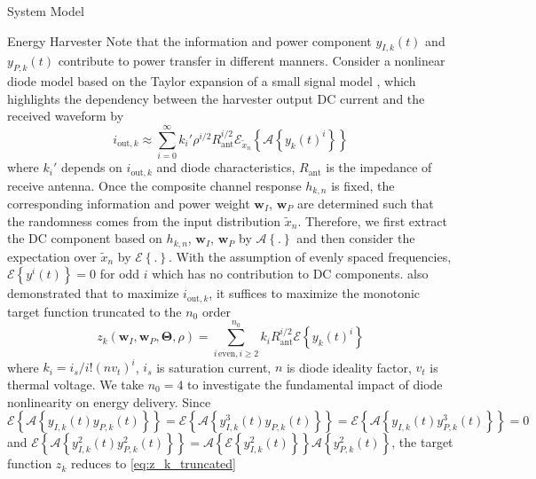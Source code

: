 \documentclass{IEEEtran}
\begin{document}
\begin{section} {System Model}
	\begin{subsection}	{Energy Harvester}
		Note that the information and power component $y_{I,k}(t)$ and $y_{P,k}(t)$ contribute to power transfer in different manners. Consider a nonlinear diode model based on the Taylor expansion of a small signal model \cite{Clerckx2018b,Clerckx2016a}, which highlights the dependency between the harvester output DC current and the received waveform by
		\begin{equation}	\label{eq:i_k}
			i_{\text{out},k}\approx\sum_{i=0}^{\infty}{k_i'}{\rho^{i/2}}{R_{\text{ant}}^{i/2}}\mathcal{E}_{\tilde{x}_n}\left\{{\mathcal{A}\left\{y_k(t)^i\right\}}\right\}
		\end{equation}
		where $k_i'$ depends on $i_{\text{out},k}$ and diode characteristics, $R_{\text{ant}}$ is the impedance of receive antenna. Once the composite channel response $h_{k,n}$ is fixed, the corresponding information and power weight $\boldsymbol{w}_I$, $\boldsymbol{w}_P$ are determined such that the randomness comes from the input distribution $\tilde{x}_n$. Therefore, we first extract the DC component based on $h_{k,n}$, $\boldsymbol{w}_I$, $\boldsymbol{w}_P$ by $\mathcal{A}\left\{.\right\}$ and then consider the expectation over $\tilde{x}_n$ by $\mathcal{E}\left\{.\right\}$. With the assumption of evenly spaced frequencies, $\mathcal{E}\left\{y^i(t)\right\}=0$ for odd $i$ which has no contribution to DC components. \cite{Clerckx2016a} also demonstrated that to maximize $i_{\text{out},k}$, it suffices to maximize the monotonic target function truncated to the $n_0$ order
		\begin{equation}	\label{eq:z_k}
			z_k(\boldsymbol{w}_I,\boldsymbol{w}_P,\boldsymbol{\Theta},\rho)=\sum_{i\,\text{even},i\ge2}^{n_0}{k_i}{R_{\text{ant}}^{i/2}}{\mathcal{E}\left\{y_k(t)^i\right\}}
		\end{equation}
		where $k_i=i_s/i!(nv_t)^i$, $i_s$ is saturation current, $n$ is diode ideality factor, $v_t$ is thermal voltage. We take $n_0=4$ to investigate the fundamental impact of diode nonlinearity on energy delivery. Since $\mathcal{E}\left\{\mathcal{A}\left\{y_{I,k}(t)y_{P,k}(t)\right\}\right\}=\mathcal{E}\left\{\mathcal{A}\left\{y_{I,k}^3(t)y_{P,k}(t)\right\}\right\}=\mathcal{E}\left\{\mathcal{A}\left\{y_{I,k}(t)y_{P,k}^3(t)\right\}\right\}=0$ and $\mathcal{E}\left\{\mathcal{A}\left\{y_{I,k}^2(t)y_{P,k}^2(t)\right\}\right\}=\mathcal{A}\left\{\mathcal{E}\left\{y_{I,k}^2(t)\right\}\right\}\mathcal{A}\left\{y_{P,k}^2(t)\right\}$, the target function $z_k$ reduces to \ref{eq:z_k_truncated}	\\

\end{subsection}
\end{section}
\end{document}
